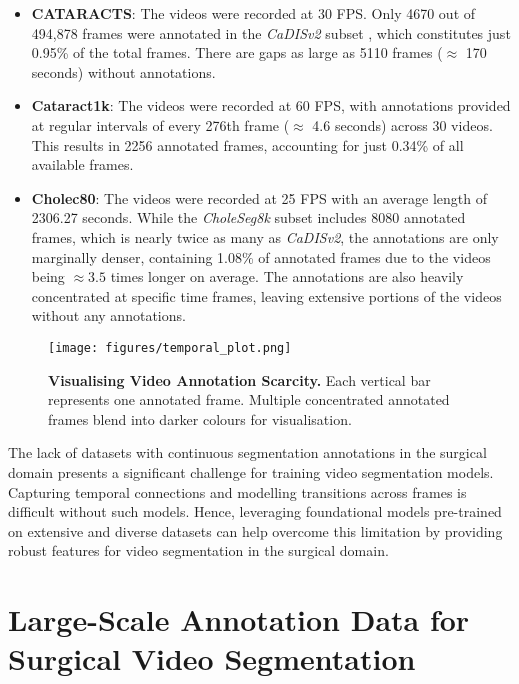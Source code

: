 \begin{itemize}
\item \textbf{CATARACTS}: The videos were recorded at 30 FPS. Only 4670 out of 494,878 frames were annotated in the \emph{CaDISv2} subset \cite{grammatikopoulou2021cadis}, which constitutes just 0.95\% of the total frames. There are gaps as large as 5110 frames ($\approx$ 170 seconds) without annotations. 

\item \textbf{Cataract1k}: The videos were recorded at 60 FPS, with annotations provided at regular intervals of every 276th frame ($\approx$ 4.6 seconds) across 30 videos. This results in 2256 annotated frames, accounting for just 0.34\% of all available frames.

\item \textbf{Cholec80}: The videos were recorded at 25 FPS with an average length of 2306.27 seconds. While the \emph{CholeSeg8k} subset \cite{hong2020cholecseg8k} includes 8080 annotated frames, which is nearly twice as many as \emph{CaDISv2}, the annotations are only marginally denser, containing 1.08\% of annotated frames due to the videos being $\approx 3.5$ times longer on average. The annotations are also heavily concentrated at specific time frames, leaving extensive portions of the videos without any annotations.
\end{itemize}

\begin{figure}[htbp]
    \centering
    \texttt{[image: figures/temporal\_plot.png]}
    \caption{\textbf{Visualising Video Annotation Scarcity.} Each vertical bar represents one annotated frame. Multiple concentrated annotated frames blend into darker colours for visualisation.}
    \label{fig:temporal_plot}
\end{figure}

The lack of datasets with continuous segmentation annotations in the surgical domain presents a significant challenge for training video segmentation models. Capturing temporal connections and modelling transitions across frames is difficult without such models. Hence, leveraging foundational models pre-trained on extensive and diverse datasets can help overcome this limitation by providing robust features for video segmentation in the surgical domain. 

\section{Large-Scale Annotation Data for Surgical Video Segmentation}
\label{sec:app_data}%

